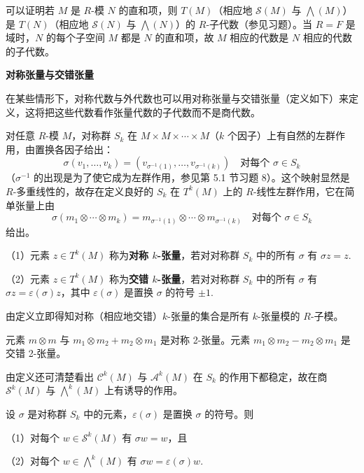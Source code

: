可以证明若 \(M\) 是 \(R\)-模 \(N\) 的直和项，则 \(T(M)\)（相应地 \(\mathcal{S}(M)\) 与 \(\bigwedge(M)\)）是 \(T(N)\)（相应地 \(\mathcal{S}(N)\) 与 \(\bigwedge(N)\)）的 \(R\)-子代数（参见习题）。当 \(R = F\) 是域时，\(N\) 的每个子空间 \(M\) 都是 \(N\) 的直和项，故 \(M\) 相应的代数是 \(N\) 相应的代数的子代数。

\noindent\textbf{对称张量与交错张量}

在某些情形下，对称代数与外代数也可以用对称张量与交错张量（定义如下）来定义，这将把这些代数看作张量代数的子代数而不是商代数。

对任意 \(R\)-模 \(M\)，对称群 \(S_k\) 在 \(M \times M \times \cdots \times M\)（\(k\) 个因子）上有自然的左群作用，由置换各因子给出：
\[
\sigma(v_1, \ldots, v_k) = (v_{\sigma^{-1}(1)}, \ldots, v_{\sigma^{-1}(k)}) \quad \text{对每个 } \sigma \in S_k
\]
（\(\sigma^{-1}\) 的出现是为了使它成为左群作用，参见第 5.1 节习题 8）。这个映射显然是 \(R\)-多重线性的，故存在定义良好的 \(S_k\) 在 \(T^k(M)\) 上的 \(R\)-线性左群作用，它在简单张量上由
\[
\sigma(m_1 \otimes \cdots \otimes m_k) = m_{\sigma^{-1}(1)} \otimes \cdots \otimes m_{\sigma^{-1}(k)} \quad \text{对每个 } \sigma \in S_k
\]
给出。

\begin{definition}
（1）元素 \(z \in T^k(M)\) 称为\textbf{对称 \(k\)-张量}，若对对称群 \(S_k\) 中的所有 \(\sigma\) 有 \(\sigma z = z\).

（2）元素 \(z \in T^k(M)\) 称为\textbf{交错 \(k\)-张量}，若对对称群 \(S_k\) 中的所有 \(\sigma\) 有 \(\sigma z = \varepsilon(\sigma)z\)，其中 \(\varepsilon(\sigma)\) 是置换 \(\sigma\) 的符号 \(\pm 1\).
\end{definition}

由定义立即得知对称（相应地交错）\(k\)-张量的集合是所有 \(k\)-张量模的 \(R\)-子模。

\begin{example}
元素 \(m \otimes m\) 与 \(m_1 \otimes m_2+m_2 \otimes m_1\) 是对称 2-张量。元素 \(m_1 \otimes m_2-m_2 \otimes m_1\) 是交错 2-张量。
\end{example}

由定义还可清楚看出 \(\mathcal{C}^k(M)\) 与 \(\mathcal{A}^k(M)\) 在 \(S_k\) 的作用下都稳定，故在商 \(\mathcal{S}^k(M)\) 与 \(\bigwedge^k(M)\) 上有诱导的作用。

\begin{proposition}\label{pro:11.39}
设 \(\sigma\) 是对称群 \(S_k\) 中的元素，\(\varepsilon(\sigma)\) 是置换 \(\sigma\) 的符号。则

（1）对每个 \(w \in \mathcal{S}^k(M)\) 有 \(\sigma w = w\)，且

（2）对每个 \(w \in \bigwedge^k(M)\) 有 \(\sigma w = \varepsilon(\sigma)w\).
\end{proposition}

